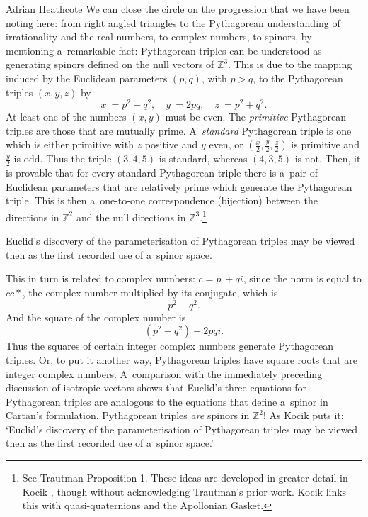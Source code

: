 \begin{artengenv}{Adrian Heathcote}
We can close the circle on the progression that we have been noting here: from right angled triangles to the Pythagorean understanding of irrationality and the real numbers, to complex numbers, to spinors, by mentioning a~remarkable fact: Pythagorean triples can be understood as generating spinors defined on the null vectors of $\mathbb{Z}^{3}$. This is due to the mapping induced by the Euclidean parameters $(p, q)$, with $p > q$, to the Pythagorean triples $(x, y, z)$ by
$$ x~= p^{2} - q^{2}, \quad y~= 2pq,\quad z~= p^{2} + q^{2}.$$
At least one of the numbers $(x, y)$ must be even. The \textit{primitive} Pythagorean triples are those that are mutually prime. A~\textit{standard} Pythagorean triple is one which is either primitive with $z$ positive and $y$ even, or $(\frac{x}{2}, \frac{y}{2}, \frac{z}{2})$ is primitive and $\frac{y}{2}$ is odd. Thus the triple $(3, 4, 5)$ is standard, whereas $(4, 3, 5)$ is not. Then, it is provable that for every standard Pythagorean triple there is a~pair of Euclidean parameters that are relatively prime which generate the Pythagorean triple. This is then a~one-to-one correspondence (bijection) between the directions in $\mathbb{Z}^{2}$ and the null directions in $\mathbb{Z}^{3}$.\footnote{See Trautman \parencite*{trautman_pythagorean_1998} Proposition 1. These ideas are developed in greater detail in Kocik \parencite*{kocik_clifford_2007}, though without acknowledging Trautman's prior work. Kocik links this with quasi-quaternions and the Apollonian Gasket.}

Euclid's discovery of the parameterisation of Pythagorean triples may be viewed then as the first recorded use of a~spinor space.

This in turn is related to complex numbers: $c = p~+ qi$, since the norm is equal to $cc*$, the complex number multiplied by its conjugate, which is $$p^{2} + q^{2}.$$ And the square of the complex number is 
\[ (p^{2} - q^{2}) + 2pqi.\]
Thus the squares of certain integer complex numbers generate Pythagorean triples. Or, to put it another way, Pythagorean triples have square roots that are integer complex numbers. A~comparison with the immediately preceding discussion of isotropic vectors shows that Euclid's three equations for Pythagorean triples are analogous to the equations that define a~spinor in Cartan's formulation. Pythagorean triples \textit{are} spinors in $\mathbb{Z}^{2}$! As Kocik \parencite*{kocik_clifford_2007} puts it: `Euclid's discovery of the parameterisation of Pythagorean triples may be viewed then as the first recorded use of a~spinor space.'


\end{artengenv}
